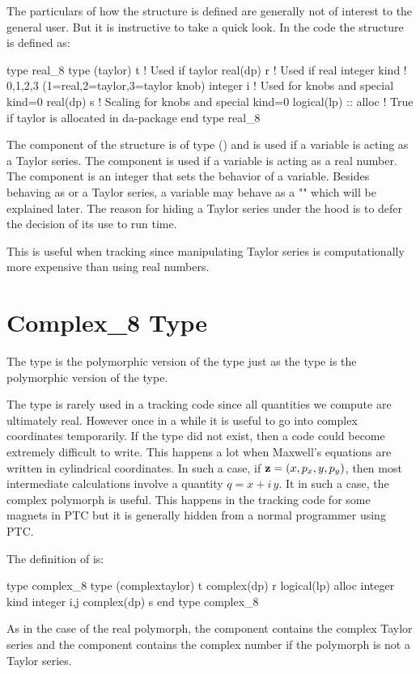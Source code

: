 \documentclass{hitec}     %
\newcommand{\Section}[1]{\section{#1}\vspace*{-1ex}}
\begin{document}
The particulars of how the  structure is defined are generally not of interest to the
general user. But it is instructive to take a quick look. In the  code the 
structure is defined as:
\begin{example}
type real_8
   type (taylor) t   ! Used if taylor
   real(dp) r        ! Used if real
   integer kind      ! 0,1,2,3 (1=real,2=taylor,3=taylor knob)
   integer i         ! Used for knobs and special kind=0
   real(dp) s        ! Scaling for knobs and special kind=0
   logical(lp) :: alloc  ! True if taylor is allocated in da-package
end type real_8
\end{example}
The  component of the structure is of type  () and is used if a
 variable is acting as a Taylor series. The  component is used if a 
variable is acting as a real number. The  component is an integer that sets the behavior of
a  variable. Besides behaving as  or a Taylor series, a  variable may
behave as a "" which will be explained later.  The reason for hiding a Taylor series under
the hood is to defer the decision of its use to run time.

This is useful when
tracking since manipulating Taylor series is computationally more expensive than using real numbers.

\Section{Complex\_8 Type}
\label{s:c8}

The type  is the polymorphic version of the  type just as the
 type is the polymorphic version of the  type.

The type  is rarely used in a tracking code since all quantities we compute are
ultimately real. However once in a while it is useful to go into complex coordinates temporarily. If
the type  did not exist, then a code could become extremely difficult to write. This
happens a lot when Maxwell's equations are written in cylindrical coordinates. In such a case, if
${\bf z}=(x,p_x,y,p_y)$, then most intermediate calculations involve a quantity $q=x+i\,y$. It in
such a case, the complex polymorph is useful. This happens in the tracking code for some magnets in
PTC but it is generally hidden from a normal programmer using PTC.

The definition of  is: 
\begin{example}
type complex_8
  type (complextaylor) t 
  complex(dp) r
  logical(lp) alloc
  integer kind
  integer i,j 
  complex(dp) s
end type complex_8
\end{example}
As in the case of the real polymorph, the  component contains the complex Taylor series and
the  component contains the complex number if the polymorph is not a Taylor series.
\end{document}
